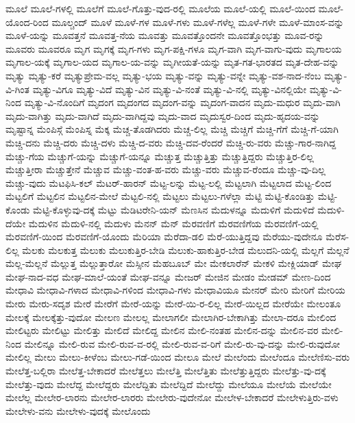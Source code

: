 {ಮೂಲೆ
ಮೂಲೆ-ಗಳಲ್ಲಿ
ಮೂಲೆಗೆ
ಮೂಲೆ-ಗೊತ್ತು-ವುದ-ರಲ್ಲಿ
ಮೂಲೆಯ
ಮೂಲೆ-ಯಲ್ಲಿ
ಮೂಲೆ-ಯಿಂದ
ಮೂಲೆ-ಯೊಂದ-ರಿಂದ
ಮೂಲ್ಚಂದ್
ಮೂಳೆ
ಮೂಳೆ-ಗಳ
ಮೂಳೆ-ಗಳು
ಮೂಳೆ-ಗಳೆಲ್ಲ
ಮೂಳೆ-ಗಳೇ
ಮೂಳೆ-ಮಾಂಸ-ವನ್ನು
ಮೂಳೆ-ಯನ್ನು
ಮೂವತ್ತನೆ
ಮೂವತ್ತ-ನೆಯ
ಮೂವತ್ತು
ಮೂವತ್ತೊಂದನೇ
ಮೂವತ್ತೊಂಭತ್ತು
ಮೂವ-ರನ್ನು
ಮೂವರು
ಮೂವರೂ
ಮೃಗ
ಮೃಗಕ್ಕೆ
ಮೃಗ-ಗಳು
ಮೃಗ-ಪಕ್ಷಿ-ಗಳೂ
ಮೃಗ-ವಾಗಿ
ಮೃಗ-ವಾಗು-ವುದು
ಮೃಗಾಲಯ
ಮೃಗಾಲ-ಯಕ್ಕೆ
ಮೃಗಾಲ-ಯದ
ಮೃಗಾಲ-ಯ-ವನ್ನು
ಮೃಗೀಯತೆ-ಯನ್ನು
ಮೃತ-ಗತ-ಭಾರತದ
ಮೃತ-ದೇಹ-ವನ್ನು
ಮೃತ್ಯು
ಮೃತ್ಯು-ಕರೆ
ಮೃತ್ಯುಪ್ರೇಮ-ವಲ್ಲ
ಮೃತ್ಯು-ಭಯ
ಮೃತ್ಯು-ವನ್ನು
ಮೃತ್ಯು-ವನ್ನೇ
ಮೃತ್ಯು-ವಶ-ನಾದ-ನೆಂಬ
ಮೃತ್ಯು-ವಿ-ಗಿಂತ
ಮೃತ್ಯು-ವಿಗೂ
ಮೃತ್ಯು-ವಿದೆ
ಮೃತ್ಯು-ವಿನ
ಮೃತ್ಯು-ವಿ-ನಂತೆ
ಮೃತ್ಯು-ವಿ-ನಲ್ಲಿ
ಮೃತ್ಯು-ವಿನಲ್ಲಿಯೇ
ಮೃತ್ಯು-ವಿ-ನಿಂದ
ಮೃತ್ಯು-ವಿ-ನೊಂದಿಗೆ
ಮೃದಂಗ
ಮೃದಂಗದ
ಮೃದಂಗ-ವನ್ನು
ಮೃದಂಗ-ವಾದನ
ಮೃದು-ಮಧುರ
ಮೃದು-ವಾಗಿ
ಮೃದು-ವಾಗಿತ್ತು
ಮೃದು-ವಾಗಿದೆ
ಮೃದು-ವಾಗಿದ್ದವು
ಮೃದು-ವಾದ
ಮೃದುಸ್ವರ-ದಿಂದ
ಮೃದು-ಹೃದಯ-ವನ್ನು
ಮೃಷ್ಟಾನ್ನ
ಮೆಂಪಿಸ್ಗೆ
ಮೆಂಪಿಸ್ನ
ಮೆಕ್ಕ
ಮೆಚ್ಚ-ತೊಡಗಿದರು
ಮೆಚ್ಚ-ಲಿಲ್ಲ
ಮೆಚ್ಚಿ
ಮೆಚ್ಚಿಗೆ
ಮೆಚ್ಚಿ-ಗೆಗೆ
ಮೆಚ್ಚಿ-ಗೆ-ಯಾಗಿ
ಮೆಚ್ಚಿ-ದನು
ಮೆಚ್ಚಿ-ದರು
ಮೆಚ್ಚಿ-ದಳು
ಮೆಚ್ಚಿ-ದ-ವರು
ಮೆಚ್ಚಿ-ದವ-ರೆಂದರೆ
ಮೆಚ್ಚಿ-ರು-ವರು
ಮೆಚ್ಚು-ಗಾರ-ನಾಗಿದ್ದ
ಮೆಚ್ಚು-ಗೆಯ
ಮೆಚ್ಚುಗೆ-ಯನ್ನು
ಮೆಚ್ಚುಗೆ-ಯನ್ನೂ
ಮೆಚ್ಚುತ್ತ
ಮೆಚ್ಚುತ್ತಿತ್ತು
ಮೆಚ್ಚುತ್ತಿದ್ದರು
ಮೆಚ್ಚುತ್ತಿರ-ಲಿಲ್ಲ
ಮೆಚ್ಚುತ್ತೀರಾ
ಮೆಚ್ಚುತ್ತೇನೆ
ಮೆಚ್ಚುವ
ಮೆಚ್ಚು-ವಂತ-ಹ-ವರು
ಮೆಚ್ಚು-ವರು
ಮೆಚ್ಚುವ-ರೆಂದೂ
ಮೆಚ್ಚು-ವು-ದಿಲ್ಲ
ಮೆಚ್ಚು-ವುದು
ಮೆಟಫಿಸಿ-ಕಲ್
ಮೆಟರ್-ಹಾರನ್
ಮೆಟ್ಟ-ಲನ್ನು
ಮೆಟ್ಟ-ಲಲ್ಲಿ
ಮೆಟ್ಟಲಾಗಿ
ಮೆಟ್ಟಲಾದ
ಮೆಟ್ಟ-ಲಿಂದ
ಮೆಟ್ಟಲಿಗೆ
ಮೆಟ್ಟಲಿನ
ಮೆಟ್ಟಲಿನ-ಮೇಲೆ
ಮೆಟ್ಟಲಿ-ನಲ್ಲಿ
ಮೆಟ್ಟಲು
ಮೆಟ್ಟಲು-ಗಳೆಲ್ಲಾ
ಮೆಟ್ಟಿ
ಮೆಟ್ಟಿ-ಕೊಂಡಿತ್ತು
ಮೆಟ್ಟಿ-ಕೊಂಡು
ಮೆಟ್ಟಿ-ಕೊಳ್ಳುವು-ದಕ್ಕೆ
ಮೆಟ್ಟು
ಮೆಡಿಟರೇನಿ-ಯನ್
ಮೆಣಸಿನ
ಮೆದುಳನ್ನೂ
ಮೆದುಳಿಗೆ
ಮೆದುಳಿದೆ
ಮೆದುಳಿ-ದೆಯೇ
ಮೆದುಳಿನ
ಮೆದುಳಿ-ನಲ್ಲಿ
ಮೆದುಳು
ಮೆನನ್
ಮೆನ್
ಮೆರವಣಿಗೆ
ಮೆರವಣಿಗೆಯ
ಮೆರವಣಿಗೆ-ಯಲ್ಲಿ
ಮೆರವಣಿಗೆ-ಯಿಂದ
ಮೆರವಣಿಗೆ-ಯೊಂದು
ಮೆರಿಯಾ
ಮೆರೆದಾ-ಡಲಿ
ಮೆರೆ-ಯುತ್ತಿದ್ದವು
ಮೆರೆಯು-ವುದೇನೂ
ಮೆರೆಸ-ಲಿಲ್ಲ
ಮೆಲಕು
ಮೆಲಕುತ್ತ
ಮೆಲುಕು
ಮೆಲುಕುತ್ತಿರ-ಬೇಡಿ
ಮೆಲುಕು-ಹಾಕುತ್ತಿರ-ಬೇಡ
ಮೆಲುದನಿ-ಯಲ್ಲಿ
ಮೆಲ್ಲಗೆ
ಮೆಲ್ಲನೆ
ಮೆಲ್ಲ-ಮೆಲ್ಲನೆ
ಮೆಲ್ಲುತ್ತ
ಮೆಲ್ಲುತ್ತಾರೋ
ಮೆಸ್ಸೀನ
ಮೆಹಬೂಬ್
ಮೇ
ಮೇಕಲಾರೆನ್
ಮೇಕಳಿ
ಮೇಕ್ಲಿಯಾಡ್
ಮೇಘ
ಮೇಘ-ನಾದ-ವಧ
ಮೇಘ-ಮಾಲೆ-ಯಂತೆ
ಮೇಘ-ವನ್ನೂ
ಮೇಜರ್
ಮೇಜಿನ
ಮೇಡಂ
ಮೇಡಮ್
ಮೇಣ-ದಿಂದ
ಮೇಧಾವಿ
ಮೇಧಾವಿ-ಗಳಾದ
ಮೇಧಾವಿ-ಗಳಿಂದ
ಮೇಧಾವಿ-ಗಳು
ಮೇಧಾವಿಯೂ
ಮೇನರ್
ಮೇರಿ
ಮೇರಿಗೆ
ಮೇರಿಯ
ಮೇರು
ಮೇರು-ಸದೃಶ
ಮೇರೆ
ಮೇರೆಗೆ
ಮೇರೆ-ಯನ್ನು
ಮೇರೆ-ಯಿ-ರ-ಲಿಲ್ಲ
ಮೇರೆ-ಯಿಲ್ಲದ
ಮೇರೆಯೇ
ಮೇಲಂತೂ
ಮೇಲಕ್ಕೆ
ಮೇಲಕ್ಕೆತ್ತು-ವುದೋ
ಮೇಲಣ
ಮೇಲಲ್ಲ
ಮೇಲಾಗಲೀ
ಮೇಲಾಗಿರ-ಬೇಕಾಗಿತ್ತು
ಮೇಲಾ-ದರೂ
ಮೇಲಿಂದ
ಮೇಲಿಟ್ಟರು
ಮೇಲಿಟ್ಟು
ಮೇಲಿತ್ತು
ಮೇಲಿದೆ
ಮೇಲಿದ್ದ
ಮೇಲಿನ
ಮೇಲಿ-ನಂತಹ
ಮೇಲಿನ-ದನ್ನು
ಮೇಲಿನ-ವರ
ಮೇಲಿ-ನಿಂದ
ಮೇಲಿನ್ನೂ
ಮೇಲಿ-ರುವ
ಮೇಲಿ-ರುವ-ವ-ರಲ್ಲಿ
ಮೇಲಿ-ರುವ-ವ-ರಿಗೆ
ಮೇಲಿ-ರು-ವು-ದನ್ನು
ಮೇಲಿ-ರುವುದೋ
ಮೇಲಿಲ್ಲ
ಮೇಲು
ಮೇಲು-ಕೀಳೆಂಬ
ಮೇಲು-ಗಡೆ-ಯಿಂದ
ಮೇಲೂ
ಮೇಲೆ
ಮೇಲೆಂದು
ಮೇಲೆಂದೂ
ಮೇಲೆಣಿಸು-ವರು
ಮೇಲೆತ್ತ-ಬಲ್ಲಿರಾ
ಮೇಲೆತ್ತ-ಬೇಕಾದರೆ
ಮೇಲೆತ್ತಲು
ಮೇಲೆತ್ತಿ
ಮೇಲೆತ್ತಿತು
ಮೇಲೆತ್ತುತ್ತಿದ್ದರು
ಮೇಲೆತ್ತು-ವು-ದಕ್ಕೆ
ಮೇಲೆತ್ತು-ವುದು
ಮೇಲೆದ್ದ
ಮೇಲೆದ್ದರು
ಮೇಲೆದ್ದಿತು
ಮೇಲೆದ್ದಿದೆ
ಮೇಲೆದ್ದು
ಮೇಲೆಯೂ
ಮೇಲೆಯೆ
ಮೇಲೆಯೇ
ಮೇಲೆಲ್ಲ
ಮೇಲೇರ-ಲಾರನು
ಮೇಲೇರ-ಲಾರರು
ಮೇಲೇರು-ವುದೇನೋ
ಮೇಲೇಳ-ಬೇಕಾದರೆ
ಮೇಲೇಳುತ್ತಿರು-ವಳು
ಮೇಲೇಳು-ವನು
ಮೇಲೇಳು-ವುದಕ್ಕೆ
ಮೇಲೊಂದು
}
